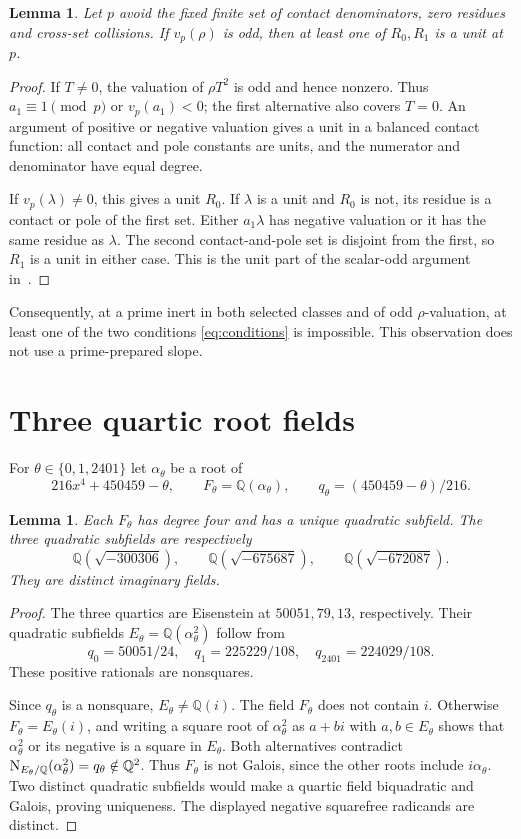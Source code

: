 \documentclass[11pt,a4paper]{article}
\newtheorem{lemma}[theorem]{Lemma}
\newcommand{\Q}{\mathbb Q}\newcommand{\Z}{\mathbb Z}
\begin{document}
\begin{lemma}\label{lem:unit}
Let $p$ avoid the fixed finite set of contact denominators, zero
residues and cross-set collisions. If $v_p(\rho)$ is odd, then
at least one of $R_0,R_1$ is a unit at $p$.
\end{lemma}
\begin{proof}
If $T\ne0$, the valuation of $\rho T^2$ is odd and hence nonzero.
Thus $a_1\equiv1\pmod p$ or $v_p(a_1)<0$; the first alternative
also covers $T=0$. An argument of positive or negative valuation
gives a unit in a balanced contact function: all contact and pole
constants are units, and the numerator and denominator have equal degree.

If $v_p(\lambda)\ne0$, this gives a unit $R_0$. If $\lambda$ is a
unit and $R_0$ is not, its residue is a contact or pole of the first
set. Either $a_1\lambda$ has negative valuation or it has the same
residue as $\lambda$. The second contact-and-pole set is disjoint
from the first, so $R_1$ is a unit in either case. This is the unit
part of the scalar-odd argument in~\cite{General,UnitNorm}.
\end{proof}

Consequently, at a prime inert in both selected classes and of odd
$\rho$-valuation, at least one of the two conditions
\eqref{eq:conditions} is impossible. This observation does not use
a prime-prepared slope.

\section{Three quartic root fields}
For $\theta\in\{0,1,2401\}$ let $\alpha_\theta$ be a root of
\[
             216x^4+450459-\theta,
 \qquad F_\theta=\Q(\alpha_\theta),\qquad
 q_\theta=(450459-\theta)/216.
\]

\begin{lemma}\label{lem:fields}
Each $F_\theta$ has degree four and has a unique quadratic subfield.
The three quadratic subfields are respectively
\[
 \Q(\sqrt{-300306}),\qquad
 \Q(\sqrt{-675687}),\qquad
 \Q(\sqrt{-672087}).
\]
They are distinct imaginary fields.
\end{lemma}
\begin{proof}
The three quartics are Eisenstein at $50051,79,13$, respectively.
Their quadratic subfields $E_\theta=\Q(\alpha_\theta^2)$ follow from
\[
       q_0=50051/24,\quad q_1=225229/108,\quad q_{2401}=224029/108.
\]
These positive rationals are nonsquares.

Since $q_\theta$ is a nonsquare, $E_\theta\ne\Q(i)$.
The field $F_\theta$ does not contain $i$. Otherwise
$F_\theta=E_\theta(i)$, and writing a square root of
$\alpha_\theta^2$ as $a+bi$ with $a,b\in E_\theta$ shows that
$\alpha_\theta^2$ or its negative is a square in $E_\theta$.
Both alternatives contradict
$\Nm_{E_\theta/\Q}(\alpha_\theta^2)=q_\theta\notin\Q^2$.
Thus $F_\theta$ is not Galois, since the other roots include
$i\alpha_\theta$. Two distinct quadratic subfields would make a
quartic field biquadratic and Galois, proving uniqueness. The displayed
negative squarefree radicands are distinct.
\end{proof}
\end{document}

